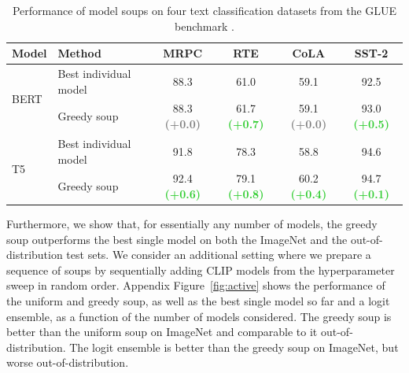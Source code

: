 \documentclass[nohyperref]{article}
\theoremstyle{plain}
\theoremstyle{definition}
\theoremstyle{remark}
\begin{document}
                \begin{table}
                    \caption{Performance of model soups on four text classification datasets from the GLUE benchmark \cite{wang2018glue}.}
                    \vspace*{-0.4cm}
                    \begin{center}\small
                    \setlength{\arrayrulewidth}{.01em}
                    \setlength{\tabcolsep}{12pt}
                    \begin{tabular}{llcccc}
                        \toprule
                        Model & Method & MRPC & RTE & CoLA & SST-2  \\\midrule
                        \multirow{2}{*}{BERT \cite{devlin2019bert}} & Best individual model & 88.3 & 61.0 & 59.1 & 92.5 \\
                        & Greedy soup & 88.3 {\textbf{\scriptsize\textcolor{gray}{(+0.0)}}} & 61.7 {\textbf{\scriptsize\textcolor{limegreen}{(+0.7)}}} & 59.1 {\textbf{\scriptsize\textcolor{gray}{(+0.0)}}} & 93.0 {\textbf{\scriptsize\textcolor{limegreen}{(+0.5)}}} \\\midrule
                        \multirow{2}{*}{T5 \cite{raffel2020t5}} & Best individual model & 91.8 & 78.3 & 58.8 & 94.6\\
                        &  Greedy soup & 92.4 {\textbf{\scriptsize\textcolor{limegreen}{(+0.6)}}} & 79.1 {\textbf{\scriptsize\textcolor{limegreen}{(+0.8)}}} & 60.2 {\textbf{\scriptsize\textcolor{limegreen}{(+0.4)}}} & 94.7 {\textbf{\scriptsize\textcolor{limegreen}{(+0.1)}}}\\
                        \bottomrule
                    \end{tabular}
                    \end{center}
                    \label{tab:nlp}
                    \vspace*{-0.4cm}
                \end{table}

        Furthermore, we show that, for essentially any number of models, the greedy soup outperforms the best single model on both the ImageNet and the out-of-distribution test sets.
        We consider an additional setting where we prepare a sequence of soups by sequentially adding CLIP models from the hyperparameter sweep in random order.
        Appendix Figure~\ref{fig:active} shows the performance of the uniform and greedy soup, as well as the best single model so far and a logit ensemble, as a function of the number of models considered. The greedy soup is better than the uniform soup on ImageNet and comparable to it out-of-distribution. The logit ensemble is better than the greedy soup on ImageNet, but worse out-of-distribution.
        
\end{document}
